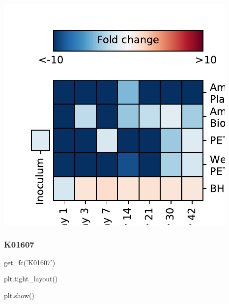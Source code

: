 \documentclass[
]{article}
\newenvironment{Shaded}{\begin{snugshade}}{\end{snugshade}}
\newcommand{\NormalTok}[1]{#1}
\newcommand{\StringTok}[1]{\textcolor[rgb]{0.31,0.60,0.02}{#1}}
\begin{document}
\includegraphics{20-6-15-PET-plastisphere-PICRUSt2_files/figure-latex/plot_fc_K01857-1.pdf}

\hypertarget{k01607-1}{%
\subsubsection{K01607}\label{k01607-1}}

\begin{Shaded}
\begin{Highlighting}[]
\NormalTok{get_fc(}\StringTok{'K01607'}\NormalTok{)}
\end{Highlighting}
\end{Shaded}

\begin{Shaded}
\begin{Highlighting}[]
\NormalTok{plt.tight_layout()}
\end{Highlighting}
\end{Shaded}

\begin{Shaded}
\begin{Highlighting}[]
\NormalTok{plt.show()}
\end{Highlighting}
\end{Shaded}
\end{document}
